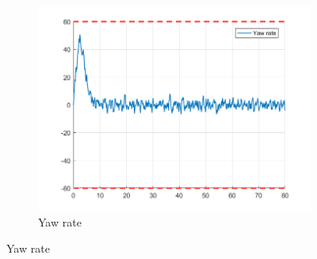 \documentclass[11pt]{article}
\begin{document}
\begin{enumerate}
\begin{figure}[ht]
\begin{subfigure}[c]{0.3\linewidth}
            \includegraphics[width=\linewidth]{Plots_12_NonlinearModel_Hexagon/09}
            \caption{Yaw rate}
        \end{subfigure}
        

\end{figure}
\end{enumerate}
\end{document}
